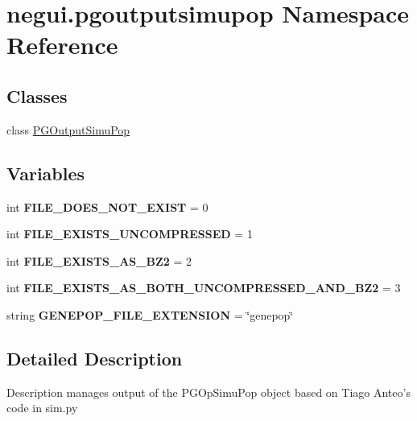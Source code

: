 \hypertarget{namespacenegui_1_1pgoutputsimupop}{}\section{negui.\+pgoutputsimupop Namespace Reference}
\label{namespacenegui_1_1pgoutputsimupop}
\subsection*{Classes}
\begin{DoxyCompactItemize}
\item 
class \hyperlink{classnegui_1_1pgoutputsimupop_1_1PGOutputSimuPop}{P\+G\+Output\+Simu\+Pop}
\end{DoxyCompactItemize}
\subsection*{Variables}
\begin{DoxyCompactItemize}
\item 
int {\bfseries F\+I\+L\+E\+\_\+\+D\+O\+E\+S\+\_\+\+N\+O\+T\+\_\+\+E\+X\+I\+ST} = 0\hypertarget{namespacenegui_1_1pgoutputsimupop_a8dce2602642103765ca0779261e6451f}{}\label{namespacenegui_1_1pgoutputsimupop_a8dce2602642103765ca0779261e6451f}

\item 
int {\bfseries F\+I\+L\+E\+\_\+\+E\+X\+I\+S\+T\+S\+\_\+\+U\+N\+C\+O\+M\+P\+R\+E\+S\+S\+ED} = 1\hypertarget{namespacenegui_1_1pgoutputsimupop_aeafac2a7762cd0232f8237814d8bf1d8}{}\label{namespacenegui_1_1pgoutputsimupop_aeafac2a7762cd0232f8237814d8bf1d8}

\item 
int {\bfseries F\+I\+L\+E\+\_\+\+E\+X\+I\+S\+T\+S\+\_\+\+A\+S\+\_\+\+B\+Z2} = 2\hypertarget{namespacenegui_1_1pgoutputsimupop_a10fa3eadfffdde1856befd5812d7b4c0}{}\label{namespacenegui_1_1pgoutputsimupop_a10fa3eadfffdde1856befd5812d7b4c0}

\item 
int {\bfseries F\+I\+L\+E\+\_\+\+E\+X\+I\+S\+T\+S\+\_\+\+A\+S\+\_\+\+B\+O\+T\+H\+\_\+\+U\+N\+C\+O\+M\+P\+R\+E\+S\+S\+E\+D\+\_\+\+A\+N\+D\+\_\+\+B\+Z2} = 3\hypertarget{namespacenegui_1_1pgoutputsimupop_a49aed528f691ead86587abc6ea1eab25}{}\label{namespacenegui_1_1pgoutputsimupop_a49aed528f691ead86587abc6ea1eab25}

\item 
string {\bfseries G\+E\+N\+E\+P\+O\+P\+\_\+\+F\+I\+L\+E\+\_\+\+E\+X\+T\+E\+N\+S\+I\+ON} = \char`\"{}genepop\char`\"{}\hypertarget{namespacenegui_1_1pgoutputsimupop_ac170ef451ea2db0e2b1500fc8a459aba}{}\label{namespacenegui_1_1pgoutputsimupop_ac170ef451ea2db0e2b1500fc8a459aba}

\end{DoxyCompactItemize}


\subsection{Detailed Description}
\begin{DoxyVerb}Description
manages output of the PGOpSimuPop object
based on Tiago Anteo's code in sim.py
\end{DoxyVerb}
 